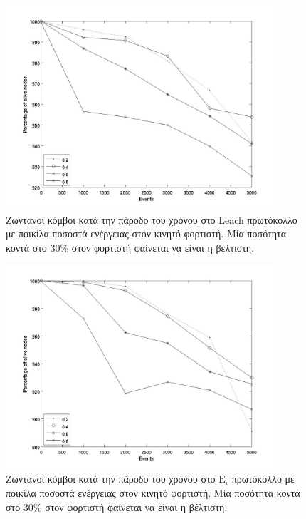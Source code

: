 \begin{figure}[H]
  \centering
  \includegraphics[width=0.9\textwidth]{experiments/classic/3.smallVSbigpercentage/alive_nodes_leach_rc_per_our-0-0.2-0.4-0.6-0.8.jpg}
  \caption{Ζωντανοί κόμβοι κατά την πάροδο του χρόνου στο Leach πρωτόκολλο με ποικίλα ποσοστά ενέργειας στον κινητό φορτιστή. Μία ποσότητα κοντά στο 30\% στον
φορτιστή φαίνεται να είναι η βέλτιστη.}
  \label{fig:3exp_1_2}
\end{figure}

\begin{figure}[H]
  \centering
  \includegraphics[width=0.9\textwidth]{experiments/classic/3.smallVSbigpercentage/alive_nodes_ei_rc_per_our-0-0.2-0.4-0.6-0.8.jpg}
  \caption{Ζωντανοί κόμβοι κατά την πάροδο του χρόνου στο $\text{E}_{i}$ πρωτόκολλο με ποικίλα ποσοστά ενέργειας στον κινητό φορτιστή. Μία ποσότητα κοντά στο 30\%
στον φορτιστή φαίνεται να είναι η βέλτιστη.}
  \label{fig:3exp_1_3}
\end{figure}


